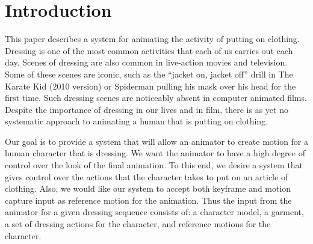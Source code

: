 \section{Introduction}


This paper describes a system for animating the activity of putting on
clothing.  Dressing is one of the most common activities that each of us
carries out each day.  Scenes of dressing are also common in live-action
movies and television.  Some of these scenes are iconic, such as the
``jacket on, jacket off'' drill in The Karate Kid (2010 version) or
Spiderman pulling his mask over his head for the first time.  Such
dressing scenes are noticeably absent in computer animated films.  Despite
the importance of dressing in our lives and in film, there is as yet no
systematic approach to animating a human that is putting on clothing.

%

Our goal is to provide a system that will allow an animator to create
motion for a human character that is dressing.  We want the animator
to have a high degree of control over the look of the final animation.
To this end, we desire a system that gives control over the actions that
the character takes to put on an article of clothing.  Also, we would
like our system to accept both keyframe and motion capture input as
reference motion for the animation.  Thus the input from the animator
for a given dressing sequence consists of: a character model, a garment,
a set of dressing actions for the character, and reference motions for
the character.  

